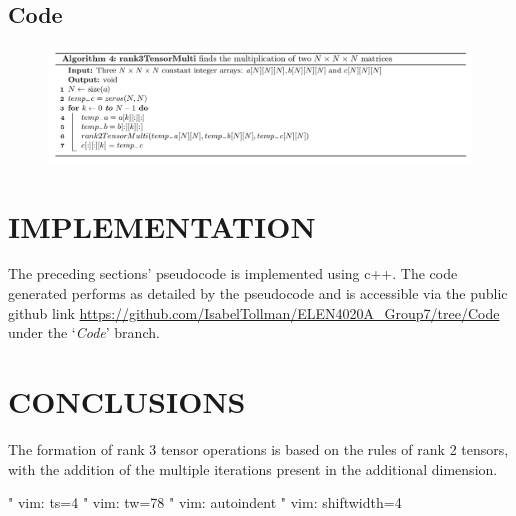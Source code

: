 \subsection{Code}
\begin{figure}[H]
\includegraphics[width=\textwidth]{build/Algo4.png}
\end{figure}
\section{IMPLEMENTATION}
The preceding sections' pseudocode is implemented using c++. The code generated performs as detailed by the pseudocode and is accessible via the public github link \url{https://github.com/IsabelTollman/ELEN4020A_Group7/tree/Code} under the `\emph{Code}' branch.

\section{CONCLUSIONS}
The formation of rank 3 tensor operations is based on the rules of rank 2 tensors, with the addition of the multiple iterations present in the additional dimension. 

\cite{1}
 







" vim: ts=4
" vim: tw=78
" vim: autoindent
" vim: shiftwidth=4
